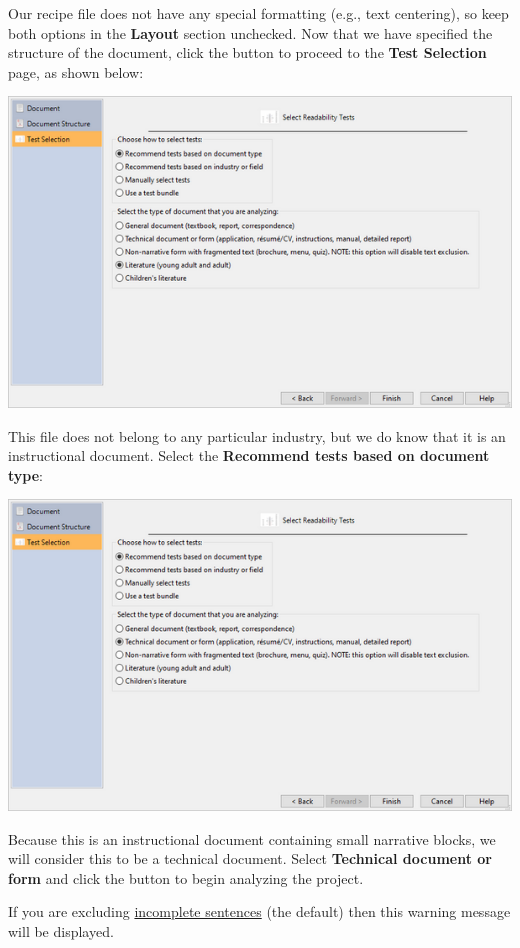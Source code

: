 \documentclass[
]{book}
\theoremstyle{definition}
\theoremstyle{definition}
\theoremstyle{definition}
\theoremstyle{definition}
\theoremstyle{remark}
\begin{document}
Our recipe file does not have any special formatting (e.g., text centering), so keep both options in the \textbf{Layout} section unchecked. Now that we have specified the structure of the document, click the  button to proceed to the \textbf{Test Selection} page, as shown below:

\includegraphics{Images/wizardreadabilitymethods.png}

This file does not belong to any particular industry, but we do know that it is an instructional document. Select the \textbf{Recommend tests based on document type}:

\includegraphics{Images/wizarddoctypetechselected.png}

Because this is an instructional document containing small narrative blocks, we will consider this to be a technical document. Select \textbf{Technical document or form} and click the  button to begin analyzing the project.

If you are excluding \protect\hyperlink{how-text-is-excluded}{incomplete sentences} (the default) then this warning message will be displayed.
\end{document}
